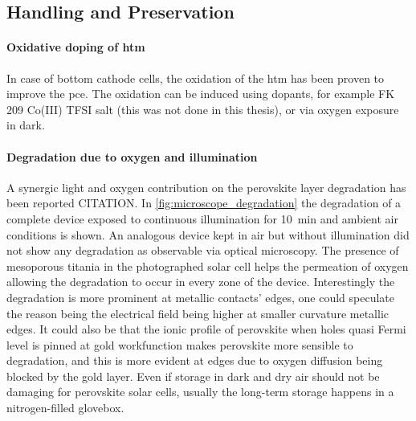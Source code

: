 		\FloatBarrier
	\subsection{Handling and Preservation}

		\paragraph{Oxidative doping of \gls{htm}} In case of bottom cathode cells, the oxidation of the \gls{htm} has been proven to improve the \gls{pce}. The oxidation can be induced using dopants, for example FK 209 Co(III) TFSI salt\cite{Burschka2013} (this was not done in this thesis), or via oxygen exposure in dark.

		\paragraph{Degradation due to oxygen and illumination}  A synergic light and oxygen contribution on the perovskite layer degradation has been reported CITATION. In \cref{fig:microscope_degradation} the degradation of a complete device exposed to continuous illumination for \SI{10}{\minute} and ambient air conditions is shown. An analogous device kept in air but without illumination did not show any degradation as observable via optical microscopy. The presence of mesoporous titania in the photographed solar cell helps the permeation of oxygen allowing the degradation to occur in every zone of the device.
		Interestingly the degradation is more prominent at metallic contacts' edges, one could speculate the reason being the electrical field being higher at smaller curvature metallic edges. It could also be that the ionic profile of perovskite when holes quasi Fermi level is pinned at gold workfunction makes perovskite more sensible to degradation, and this is more evident at edges due to oxygen diffusion being blocked by the gold layer.
		Even if storage in dark and dry air should not be damaging for perovskite solar cells, usually the long-term storage happens in a nitrogen-filled glovebox.


